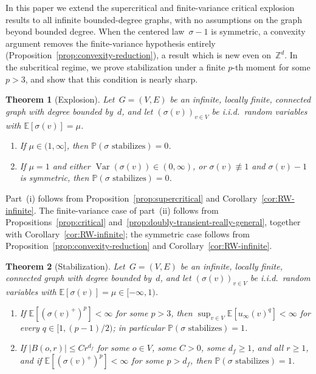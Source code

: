 \documentclass[aop]{imsart}
\theoremstyle{plain}
\newtheorem{theorem}{Theorem}[section]
\theoremstyle{definition}
\newcommand{\Z}{\mathbb{Z}}
\newcommand{\E}{\mathbb{E}}
\renewcommand{\P}{\mathbb{P}}
\DeclareMathOperator{\var}{Var}
\begin{document}
	In this paper we extend the supercritical and finite-variance critical explosion results to all infinite bounded-degree graphs, with no assumptions on the graph beyond bounded degree. When the centered law~$\sigma-1$ is symmetric, a convexity argument removes the finite-variance hypothesis entirely (Proposition~\ref{prop:convexity-reduction}), a result which is new even on~$\Z^d$. In the subcritical regime, we prove stabilization under a finite $p$-th moment for some $p > 3$, and show that this condition is nearly sharp.
	
	\begin{theorem}[Explosion]\label{thm:explosion}
		Let~$G = (V,E)$ be an infinite, locally finite, connected graph with
		degree bounded by~$d$, and let $(\sigma(v))_{v\in V}$ be i.i.d.\ random variables
		with $\E[\sigma(v)] = \mu$.
		\begin{enumerate}[label=\textup{(\roman*)}]
			\item If $\mu \in (1,\infty]$, then
			$\P(\sigma \text{ stabilizes}) = 0$.
			\item If $\mu = 1$ and either $\var(\sigma(v))\in(0,\infty)$, or $\sigma(v)\not\equiv 1$ and $\sigma(v)-1$ is symmetric, then
			$\P(\sigma \text{ stabilizes}) = 0$.
		\end{enumerate}
	\end{theorem}
	
	Part~(i) follows from Proposition~\ref{prop:supercritical} and Corollary~\ref{cor:RW-infinite}. The finite-variance case of part~(ii) follows from Propositions~\ref{prop:critical} and~\ref{prop:doubly-transient-really-general}, together with Corollary~\ref{cor:RW-infinite}; the symmetric case follows from Proposition~\ref{prop:convexity-reduction} and Corollary~\ref{cor:RW-infinite}.
	
	\begin{theorem}[Stabilization]\label{thm:stab}
		Let~$G = (V,E)$ be an infinite, locally finite, connected graph with
		degree bounded by~$d$, and let $(\sigma(v))_{v\in V}$ be i.i.d.\ random variables
		with $\E[\sigma(v)] = \mu \in [-\infty,1)$.
		\begin{enumerate}[label=\textup{(\roman*)}]
			\item If $\E[(\sigma(v)^+)^p] < \infty$ for some $p > 3$, then
			$\sup_{v \in V}\E[u_\infty(v)^q] < \infty$ for every $q\in[1,(p-1)/2)$; in particular $\P(\sigma \text{ stabilizes}) = 1$.
			\item If $|B(o,r)|\leq C r^{d_f}$ for some $o\in V$, some $C>0$, some $d_f\geq 1$, and all $r\geq 1$, and if $\E[(\sigma(v)^+)^p] < \infty$ for some $p > d_f$, then $\P(\sigma \text{ stabilizes}) = 1$.
		\end{enumerate}
	\end{theorem}
	
\end{document}
